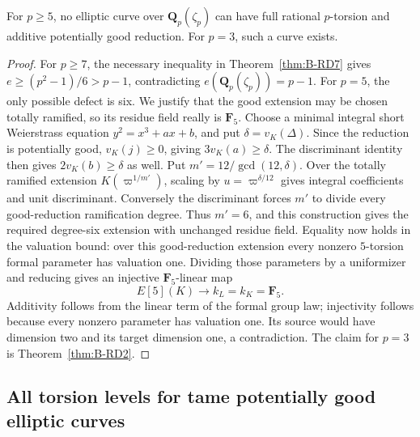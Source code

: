 \begin{corollary}\label{cor:B-RD11}
For $p\geq5$, no elliptic curve over $\mathbf Q_p(\zeta_p)$ can have
full rational $p$-torsion and additive potentially good reduction.
For $p=3$, such a curve exists.
\end{corollary}
\begin{proof}
For $p\geq7$, the necessary inequality in
Theorem~\ref{thm:B-RD7} gives
$e\geq(p^2-1)/6>p-1$, contradicting $e(\mathbf Q_p(\zeta_p))=p-1$.
For $p=5$, the only possible defect is six. We justify that the good
extension may be chosen totally ramified, so its residue field really
is $\mathbf F_5$. Choose a minimal integral short Weierstrass equation
$y^2=x^3+ax+b$, and put $\delta=v_K(\Delta)$. Since the reduction is
potentially good, $v_K(j)\geq0$, giving $3v_K(a)\geq\delta$.
The discriminant identity then gives $2v_K(b)\geq\delta$ as well.
Put $m'=12/\gcd(12,\delta)$. Over the totally ramified extension
$K(\varpi^{1/m'})$, scaling by $u=\varpi^{\delta/12}$ gives integral
coefficients and unit discriminant. Conversely the discriminant
forces $m'$ to divide every good-reduction ramification degree.
Thus $m'=6$, and this construction gives the required degree-six
extension with unchanged residue field. Equality now holds in the
valuation bound: over this good-reduction extension every nonzero
$5$-torsion formal parameter has valuation one. Dividing those
parameters by a uniformizer and reducing gives an injective
$\mathbf F_5$-linear map
\[
 E[5](K)\longrightarrow k_L=k_K=\mathbf F_5.
\]
Additivity follows from the linear term of the formal group law;
injectivity follows because every nonzero parameter has valuation
one. Its source would have dimension two and its target dimension
one, a contradiction. The claim for $p=3$ is
Theorem~\ref{thm:B-RD2}.
\end{proof}

\subsection{All torsion levels for tame potentially good elliptic curves}

